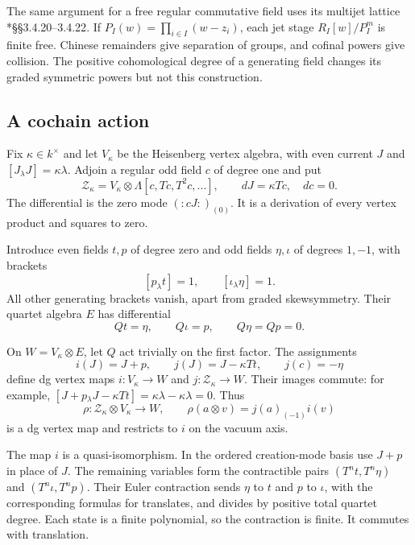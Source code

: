 The same argument for a free regular commutative field
uses its multijet lattice
\cite{BD04}*{\S\S3.4.20--3.4.22}.
If $P_I(w)=\prod_{i\in I}(w-z_i)$, each jet stage
$R_I[w]/P_I^m$ is finite free. Chinese remainders
give separation of groups, and cofinal powers give
collision. The positive cohomological degree of a
generating field changes its graded symmetric powers
but not this construction.

\subsection{A cochain action}
\label{cbc:va:cochain-action}

Fix $\kappa\in k^\times$ and let $V_\kappa$ be the
Heisenberg vertex algebra, with even current $J$ and
$[J_\lambda J]=\kappa\lambda$.
Adjoin a regular odd field $c$ of degree one and put
\[
 \mathcal Z_\kappa=V_\kappa\otimes\Lambda[c,Tc,T^2c,\ldots],
 \qquad dJ=\kappa Tc,\quad dc=0.
\]
The differential is the zero mode $(:cJ:)_{(0)}$.
It is a derivation of every vertex product and
squares to zero.

Introduce even fields $t,p$ of degree zero and odd
fields $\eta,\iota$ of degrees $1,-1$, with brackets
\[
 [p_\lambda t]=1,\qquad [\iota_\lambda\eta]=1.
\]
All other generating brackets vanish, apart from
graded skewsymmetry. Their quartet algebra $E$ has
differential
\[
 Qt=\eta,\qquad Q\iota=p,\qquad Q\eta=Qp=0.
\]

On $W=V_\kappa\otimes E$, let $Q$ act trivially on
the first factor. The assignments
\begin{equation}\label{cbc:va:quartet-maps}
 i(J)=J+p,\qquad
 j(J)=J-\kappa Tt,\qquad j(c)=-\eta
\end{equation}
define dg vertex maps $i:V_\kappa\to W$ and
$j:\mathcal Z_\kappa\to W$.
Their images commute: for example,
$[J+p{}_\lambda J-\kappa Tt]=\kappa\lambda-\kappa\lambda=0$.
Thus
\[
 \rho:\mathcal Z_\kappa\otimes V_\kappa\longrightarrow W,
 \qquad \rho(a\otimes v)=j(a)_{(-1)}i(v)
\]
is a dg vertex map and restricts to $i$ on the vacuum axis.

The map $i$ is a quasi-isomorphism. In the ordered
creation-mode basis use $J+p$ in place of $J$.
The remaining variables form the contractible pairs
$(T^nt,T^n\eta)$ and $(T^n\iota,T^np)$.
Their Euler contraction sends $\eta$ to $t$ and $p$
to $\iota$, with the corresponding formulas for
translates, and divides by positive total quartet
degree. Each state is a finite polynomial, so the
contraction is finite. It commutes with translation.

